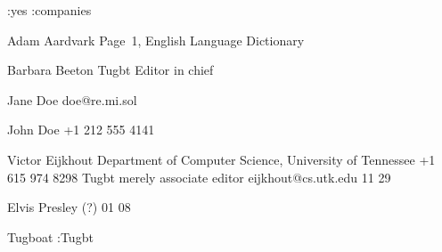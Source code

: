 
\WriteExtern:yes
\Start
\LoadExternalFile:companies

\Entity Adam Aardvark
\Address Page~1, English Language Dictionary
\>

\Entity Barbara Beeton
\At Tugbt
\Note Editor in chief
\>

\Entity Jane Doe
\email doe@re.mi.sol
\>

\Entity John Doe
\phone +1 212 555 4141
\>

\Entity Victor Eijkhout
\Address Department of Computer Science, University of Tennessee
\phone +1 615 974 8298
\At Tugbt
\Note merely associate editor
\email eijkhout@cs.utk.edu
 11 29
\>

\Entity Elvis Presley
(?) 01 08
\>

\Entity Tugboat
\TheList:Tugbt
\>

\AllBirths

\Stop

